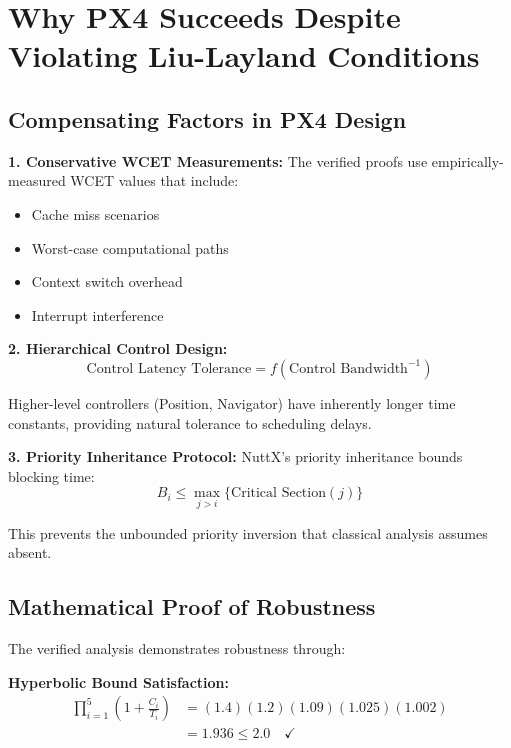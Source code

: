 \documentclass[12pt,a4paper]{article}
\begin{document}
\section{Why PX4 Succeeds Despite Violating Liu-Layland Conditions}

\subsection{Compensating Factors in PX4 Design}

\textbf{1. Conservative WCET Measurements:}
The verified proofs use empirically-measured WCET values that include:
\begin{itemize}
\item Cache miss scenarios
\item Worst-case computational paths
\item Context switch overhead
\item Interrupt interference
\end{itemize}

\textbf{2. Hierarchical Control Design:}
\begin{equation}
\text{Control Latency Tolerance} = f(\text{Control Bandwidth}^{-1})
\end{equation}

Higher-level controllers (Position, Navigator) have inherently longer time constants, providing natural tolerance to scheduling delays.

\textbf{3. Priority Inheritance Protocol:}
NuttX's priority inheritance bounds blocking time:
\begin{equation}
B_i \leq \max_{j > i} \{\text{Critical Section}(j)\}
\end{equation}

This prevents the unbounded priority inversion that classical analysis assumes absent.

\subsection{Mathematical Proof of Robustness}

The verified analysis demonstrates robustness through:

\textbf{Hyperbolic Bound Satisfaction:}
\begin{align}
\prod_{i=1}^{5} \left(1 + \frac{C_i}{T_i}\right) &= (1.4)(1.2)(1.09)(1.025)(1.002) \\
&= 1.936 \leq 2.0 \quad \checkmark
\end{align}
\end{document}
